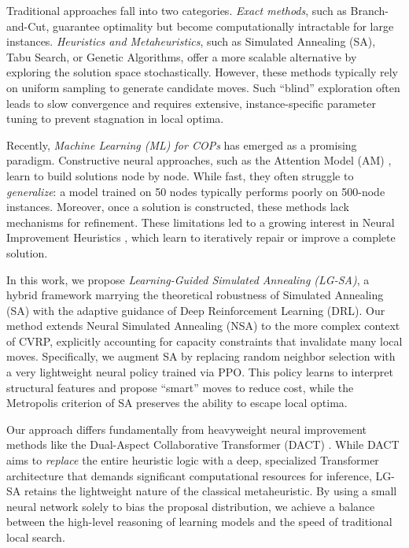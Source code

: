 \documentclass[letterpaper]{article} %
\begin{document}
Traditional approaches fall into two categories. \textit{Exact methods}, such as Branch-and-Cut, guarantee optimality but become computationally intractable for large instances. \textit{Heuristics and Metaheuristics}, such as Simulated Annealing (SA), Tabu Search, or Genetic Algorithms, offer a more scalable alternative by exploring the solution space stochastically. However, these methods typically rely on uniform sampling to generate candidate moves. Such ``blind'' exploration often leads to slow convergence and requires extensive, instance-specific parameter tuning to prevent stagnation in local optima.

Recently, \textit{Machine Learning (ML) for COPs} has emerged as a promising paradigm. Constructive neural approaches, such as the Attention Model (AM) \citep{kool_attention_2019}, learn to build solutions node by node. While fast, they often struggle to \textit{generalize}: a model trained on 50 nodes typically performs poorly on 500-node instances. Moreover, once a solution is constructed, these methods lack mechanisms for refinement. These limitations led to a growing interest in Neural Improvement Heuristics \citep{wu_learning_2022,garcia-torres_combining_2022}, which learn to iteratively repair or improve a complete solution.

In this work, we propose \textit{Learning-Guided Simulated Annealing (LG-SA)}, a hybrid framework marrying the theoretical robustness of Simulated Annealing (SA) with the adaptive guidance of Deep Reinforcement Learning (DRL). Our method extends Neural Simulated Annealing (NSA) \citep{correia_neural_2023} to the more complex context of CVRP, explicitly accounting for capacity constraints that invalidate many local moves. Specifically, we augment SA by replacing random neighbor selection with a very lightweight neural policy trained via PPO. This policy learns to interpret structural features and propose ``smart'' moves to reduce cost, while the Metropolis criterion of SA preserves the ability to escape local optima.

Our approach differs fundamentally from heavyweight neural improvement methods like the Dual-Aspect Collaborative Transformer (DACT) \citep{ma_learning_2021}. While DACT aims to \textit{replace} the entire heuristic logic with a deep, specialized Transformer architecture that demands significant computational resources for inference, LG-SA retains the lightweight nature of the classical metaheuristic. By using a small neural network solely to bias the proposal distribution, we achieve a balance between the high-level reasoning of learning models and the speed of traditional local search.
\end{document}
